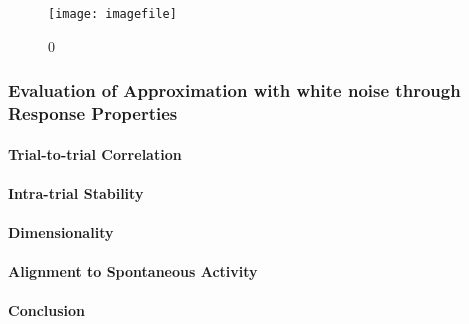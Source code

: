 \documentclass[11pt]{article}
\begin{document}
		\begin{figure} 
			\centering
			\caption{0}
			\texttt{[image: imagefile]}
			\label{}
		\end{figure}
	
	\subsubsection{Evaluation of Approximation with white noise through Response Properties}
	
	\paragraph{Trial-to-trial Correlation}
	
	\paragraph{Intra-trial Stability}
	
	\paragraph{Dimensionality}
	
	\paragraph{Alignment to Spontaneous Activity}
	
	\paragraph{Conclusion}
	
\end{document}
